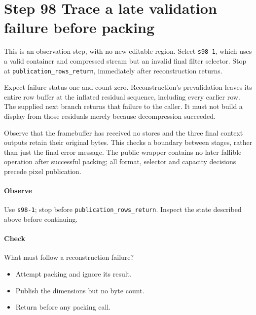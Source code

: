 \section{Step 98 Trace a late validation failure before packing}
This is an observation step, with no new editable region. Select \texttt{s98-1}, which uses a valid container and compressed stream but an invalid final filter selector. Stop at \texttt{publication\_rows\_return}, immediately after reconstruction returns.

Expect failure status one and count zero. Reconstruction’s prevalidation leaves its entire row buffer at the inflated residual sequence, including every earlier row. The supplied next branch returns that failure to the caller. It must not build a display from those residuals merely because decompression succeeded.

Observe that the framebuffer has received no stores and the three final context outputs retain their original bytes. This checks a boundary between stages, rather than just the final error message. The public wrapper contains no later fallible operation after successful packing; all format, selector and capacity decisions precede pixel publication.

\paragraph{Observe} Use \texttt{s98-1}; stop before \texttt{publication\_rows\_return}. Inspect the state described above before continuing.

\paragraph{Check} What must follow a reconstruction failure?
\begin{itemize}
\item[A.] Attempt packing and ignore its result.
\item[B.] Publish the dimensions but no byte count.
\item[C.] Return before any packing call.
\end{itemize}

